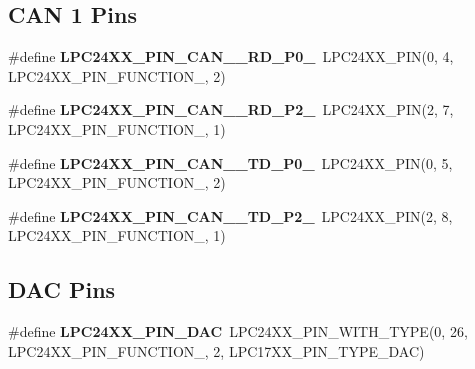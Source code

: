 \subsection*{C\+AN 1 Pins}
\begin{DoxyCompactItemize}
\item 
\mbox{\label{group__lpc24xx__io_ga978b0bbe6e71b503b4e0156ce494036e}} 
\#define {\bfseries L\+P\+C24\+X\+X\+\_\+\+P\+I\+N\+\_\+\+C\+A\+N\+\_\+\_\+\+R\+D\+\_\+\+P0\+\_}~L\+P\+C24\+X\+X\+\_\+\+P\+IN(0, 4, L\+P\+C24\+X\+X\+\_\+\+P\+I\+N\+\_\+\+F\+U\+N\+C\+T\+I\+O\+N\+\_, 2)
\item 
\mbox{\label{group__lpc24xx__io_ga15a7018b30bfd4d3ca5f4326cfdb5bc3}} 
\#define {\bfseries L\+P\+C24\+X\+X\+\_\+\+P\+I\+N\+\_\+\+C\+A\+N\+\_\+\_\+\+R\+D\+\_\+\+P2\+\_}~L\+P\+C24\+X\+X\+\_\+\+P\+IN(2, 7, L\+P\+C24\+X\+X\+\_\+\+P\+I\+N\+\_\+\+F\+U\+N\+C\+T\+I\+O\+N\+\_, 1)
\item 
\mbox{\label{group__lpc24xx__io_gab056759dafc88edabbece2aa09061ddc}} 
\#define {\bfseries L\+P\+C24\+X\+X\+\_\+\+P\+I\+N\+\_\+\+C\+A\+N\+\_\+\_\+\+T\+D\+\_\+\+P0\+\_}~L\+P\+C24\+X\+X\+\_\+\+P\+IN(0, 5, L\+P\+C24\+X\+X\+\_\+\+P\+I\+N\+\_\+\+F\+U\+N\+C\+T\+I\+O\+N\+\_, 2)
\item 
\mbox{\label{group__lpc24xx__io_gac95cda635f56f60d0acf792026c1c60d}} 
\#define {\bfseries L\+P\+C24\+X\+X\+\_\+\+P\+I\+N\+\_\+\+C\+A\+N\+\_\+\_\+\+T\+D\+\_\+\+P2\+\_}~L\+P\+C24\+X\+X\+\_\+\+P\+IN(2, 8, L\+P\+C24\+X\+X\+\_\+\+P\+I\+N\+\_\+\+F\+U\+N\+C\+T\+I\+O\+N\+\_, 1)
\end{DoxyCompactItemize}
\subsection*{D\+AC Pins}
\begin{DoxyCompactItemize}
\item 
\mbox{\label{group__lpc24xx__io_gadb2fd4c8a4fb91fce7935a0b70f7e7a5}} 
\#define {\bfseries L\+P\+C24\+X\+X\+\_\+\+P\+I\+N\+\_\+\+D\+AC}~L\+P\+C24\+X\+X\+\_\+\+P\+I\+N\+\_\+\+W\+I\+T\+H\+\_\+\+T\+Y\+PE(0, 26, L\+P\+C24\+X\+X\+\_\+\+P\+I\+N\+\_\+\+F\+U\+N\+C\+T\+I\+O\+N\+\_, 2, L\+P\+C17\+X\+X\+\_\+\+P\+I\+N\+\_\+\+T\+Y\+P\+E\+\_\+\+D\+AC)
\end{DoxyCompactItemize}
